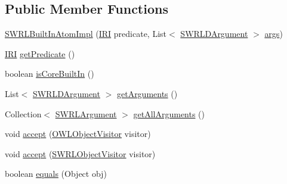 \subsection*{Public Member Functions}
\begin{DoxyCompactItemize}
\item 
\hyperlink{classuk_1_1ac_1_1manchester_1_1cs_1_1owl_1_1owlapi_1_1_s_w_r_l_built_in_atom_impl_a4ef9d5d832ec65d7e0fbdff164cb5239}{S\-W\-R\-L\-Built\-In\-Atom\-Impl} (\hyperlink{classorg_1_1semanticweb_1_1owlapi_1_1model_1_1_i_r_i}{I\-R\-I} predicate, List$<$ \hyperlink{interfaceorg_1_1semanticweb_1_1owlapi_1_1model_1_1_s_w_r_l_d_argument}{S\-W\-R\-L\-D\-Argument} $>$ \hyperlink{classuk_1_1ac_1_1manchester_1_1cs_1_1owl_1_1owlapi_1_1_s_w_r_l_built_in_atom_impl_a4e5b8d2530722a62574df36531152156}{args})
\item 
\hyperlink{classorg_1_1semanticweb_1_1owlapi_1_1model_1_1_i_r_i}{I\-R\-I} \hyperlink{classuk_1_1ac_1_1manchester_1_1cs_1_1owl_1_1owlapi_1_1_s_w_r_l_built_in_atom_impl_ad4d6690682ad9bc4f0a7ac08a851b8db}{get\-Predicate} ()
\item 
boolean \hyperlink{classuk_1_1ac_1_1manchester_1_1cs_1_1owl_1_1owlapi_1_1_s_w_r_l_built_in_atom_impl_afd2473f78679a7730b1e343576e9d8b9}{is\-Core\-Built\-In} ()
\item 
List$<$ \hyperlink{interfaceorg_1_1semanticweb_1_1owlapi_1_1model_1_1_s_w_r_l_d_argument}{S\-W\-R\-L\-D\-Argument} $>$ \hyperlink{classuk_1_1ac_1_1manchester_1_1cs_1_1owl_1_1owlapi_1_1_s_w_r_l_built_in_atom_impl_a3975494398aa213ce0367d7631f8b822}{get\-Arguments} ()
\item 
Collection$<$ \hyperlink{interfaceorg_1_1semanticweb_1_1owlapi_1_1model_1_1_s_w_r_l_argument}{S\-W\-R\-L\-Argument} $>$ \hyperlink{classuk_1_1ac_1_1manchester_1_1cs_1_1owl_1_1owlapi_1_1_s_w_r_l_built_in_atom_impl_ad2d8be6e6665617787314fc46d1020ac}{get\-All\-Arguments} ()
\item 
void \hyperlink{classuk_1_1ac_1_1manchester_1_1cs_1_1owl_1_1owlapi_1_1_s_w_r_l_built_in_atom_impl_a4f879f055f41b08cbb4dc04bb3222b33}{accept} (\hyperlink{interfaceorg_1_1semanticweb_1_1owlapi_1_1model_1_1_o_w_l_object_visitor}{O\-W\-L\-Object\-Visitor} visitor)
\item 
void \hyperlink{classuk_1_1ac_1_1manchester_1_1cs_1_1owl_1_1owlapi_1_1_s_w_r_l_built_in_atom_impl_a6796978b6d29a608863e356cf22aba68}{accept} (\hyperlink{interfaceorg_1_1semanticweb_1_1owlapi_1_1model_1_1_s_w_r_l_object_visitor}{S\-W\-R\-L\-Object\-Visitor} visitor)
\item 
boolean \hyperlink{classuk_1_1ac_1_1manchester_1_1cs_1_1owl_1_1owlapi_1_1_s_w_r_l_built_in_atom_impl_a3def9932b243f280b758c9003e67e5bf}{equals} (Object obj)
\end{DoxyCompactItemize}
